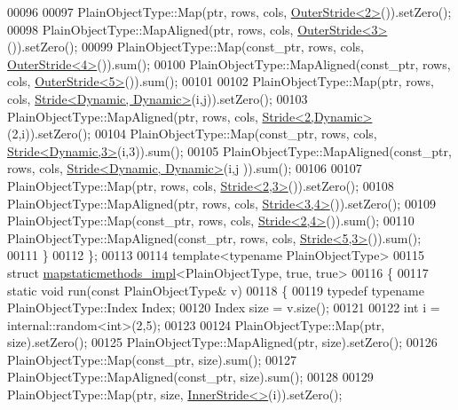 \begin{DoxyCode}
00096 
00097     PlainObjectType::Map(ptr, rows, cols, \hyperlink{class_eigen_1_1_outer_stride}{OuterStride<2>}()).setZero();
00098     PlainObjectType::MapAligned(ptr, rows, cols, \hyperlink{class_eigen_1_1_outer_stride}{OuterStride<3>}()).setZero();
00099     PlainObjectType::Map(const\_ptr, rows, cols, \hyperlink{class_eigen_1_1_outer_stride}{OuterStride<4>}()).sum();
00100     PlainObjectType::MapAligned(const\_ptr, rows, cols, \hyperlink{class_eigen_1_1_outer_stride}{OuterStride<5>}()).sum();
00101 
00102     PlainObjectType::Map(ptr, rows, cols, \hyperlink{group___core___module_class_eigen_1_1_stride}{Stride<Dynamic, Dynamic>}(i,j)).setZero();
00103     PlainObjectType::MapAligned(ptr, rows, cols, \hyperlink{group___core___module_class_eigen_1_1_stride}{Stride<2,Dynamic>}(2,i)).setZero();
00104     PlainObjectType::Map(const\_ptr, rows, cols, \hyperlink{group___core___module_class_eigen_1_1_stride}{Stride<Dynamic,3>}(i,3)).sum();
00105     PlainObjectType::MapAligned(const\_ptr, rows, cols, \hyperlink{group___core___module_class_eigen_1_1_stride}{Stride<Dynamic, Dynamic>}(i,j
      )).sum();
00106 
00107     PlainObjectType::Map(ptr, rows, cols, \hyperlink{group___core___module_class_eigen_1_1_stride}{Stride<2,3>}()).setZero();
00108     PlainObjectType::MapAligned(ptr, rows, cols, \hyperlink{group___core___module_class_eigen_1_1_stride}{Stride<3,4>}()).setZero();
00109     PlainObjectType::Map(const\_ptr, rows, cols, \hyperlink{group___core___module_class_eigen_1_1_stride}{Stride<2,4>}()).sum();
00110     PlainObjectType::MapAligned(const\_ptr, rows, cols, \hyperlink{group___core___module_class_eigen_1_1_stride}{Stride<5,3>}()).sum();
00111   \}
00112 \};
00113 
00114 \textcolor{keyword}{template}<\textcolor{keyword}{typename} PlainObjectType>
00115 \textcolor{keyword}{struct }\hyperlink{structmapstaticmethods__impl}{mapstaticmethods\_impl}<PlainObjectType, true, true>
00116 \{
00117   \textcolor{keyword}{static} \textcolor{keywordtype}{void} run(\textcolor{keyword}{const} PlainObjectType& v)
00118   \{
00119     \textcolor{keyword}{typedef} \textcolor{keyword}{typename} PlainObjectType::Index Index;
00120     Index size = v.size();
00121 
00122     \textcolor{keywordtype}{int} i = internal::random<int>(2,5);
00123 
00124     PlainObjectType::Map(ptr, size).setZero();
00125     PlainObjectType::MapAligned(ptr, size).setZero();
00126     PlainObjectType::Map(const\_ptr, size).sum();
00127     PlainObjectType::MapAligned(const\_ptr, size).sum();
00128 
00129     PlainObjectType::Map(ptr, size, \hyperlink{class_eigen_1_1_inner_stride}{InnerStride<>}(i)).setZero();

\end{DoxyCode}
